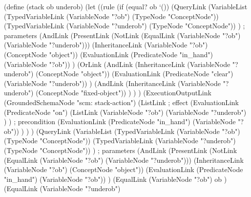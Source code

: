 \begin{python}
(define (stack ob underob)
  (let
    ((rule
      (if (equal? ob `())
        (QueryLink
          (VariableList
            (TypedVariableLink 
              (VariableNode "?ob") 
              (TypeNode "ConceptNode"))
            (TypedVariableLink 
              (VariableNode "?underob") 
              (TypeNode "ConceptNode"))
          ) ; parameters
          (AndLink
            (PresentLink
              (NotLink
                (EqualLink 
                  (VariableNode "?ob") 
                  (VariableNode "?underob")))
              (InheritanceLink
                (VariableNode "?ob")
                (ConceptNode "object"))
              (EvaluationLink
                (PredicateNode "in_hand")
                (VariableNode "?ob"))
            )
            (OrLink
              (AndLink
                (InheritanceLink
                  (VariableNode "?underob")
                  (ConceptNode "object"))
                (EvaluationLink
                  (PredicateNode "clear")
                  (VariableNode "?underob"))
              )
              (AndLink
                (InheritanceLink
                  (VariableNode "?underob")
                  (ConceptNode "fixed-object"))
              )
            )
          )
          (ExecutionOutputLink
            (GroundedSchemaNode "scm: stack-action")
            (ListLink
              ; effect
              (EvaluationLink
                (PredicateNode "on")
                (ListLink
                  (VariableNode "?ob")
                  (VariableNode "?underob")
                )
              )
              ; precondition
              (EvaluationLink
                (PredicateNode "in_hand")
                (VariableNode "?ob"))
            )
          )
        )
        (QueryLink
          (VariableList
            (TypedVariableLink 
              (VariableNode "?ob") 
              (TypeNode "ConceptNode"))
            (TypedVariableLink 
              (VariableNode "?underob") 
              (TypeNode "ConceptNode"))
          ) ; parameters
          (AndLink
            (PresentLink
              (NotLink
                (EqualLink 
                  (VariableNode "?ob") 
                  (VariableNode "?underob")))
              (InheritanceLink
                (VariableNode "?ob")
                (ConceptNode "object"))
              (EvaluationLink
                (PredicateNode "in_hand")
                (VariableNode "?ob"))
            )
            (EqualLink
              (VariableNode "?ob")
              ob
            )
            (EqualLink
              (VariableNode "?underob")

\end{python}
